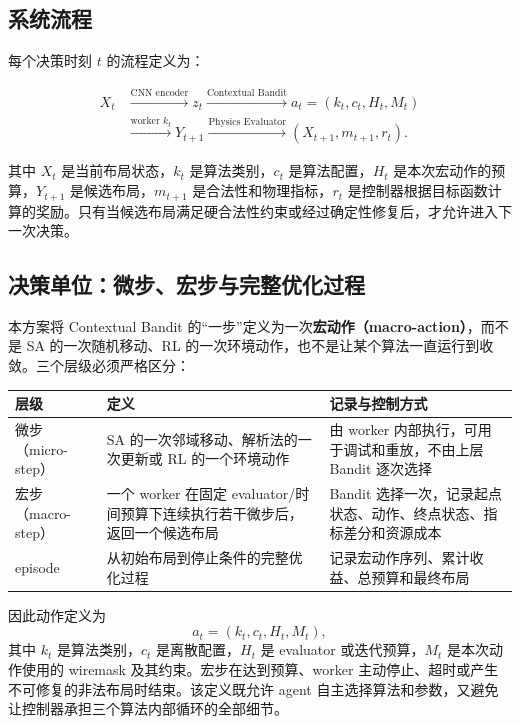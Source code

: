 \documentclass[UTF8,a4paper,11pt]{ctexart}
\newcommand{\important}[1]{\textbf{#1}}
\begin{document}
\subsection{系统流程}

每个决策时刻 \(t\) 的流程定义为：

\begin{equation}
\begin{aligned}
X_t &\xrightarrow{\text{CNN encoder}} z_t
\xrightarrow{\text{Contextual Bandit}} a_t=(k_t,c_t,H_t,M_t)
\\[-0.2em]
&\xrightarrow{\text{worker }k_t}
Y_{t+1}
\xrightarrow{\text{Physics Evaluator}}
(X_{t+1},m_{t+1},r_t).
\end{aligned}
\end{equation}

其中 \(X_t\) 是当前布局状态，\(k_t\) 是算法类别，\(c_t\) 是算法配置，\(H_t\) 是本次宏动作的预算，\(Y_{t+1}\) 是候选布局，\(m_{t+1}\) 是合法性和物理指标，\(r_t\) 是控制器根据目标函数计算的奖励。只有当候选布局满足硬合法性约束或经过确定性修复后，才允许进入下一次决策。

\subsection{决策单位：微步、宏步与完整优化过程}

本方案将 Contextual Bandit 的“一步”定义为一次\important{宏动作（macro-action）}，而不是 SA 的一次随机移动、RL 的一次环境动作，也不是让某个算法一直运行到收敛。三个层级必须严格区分：

\begin{table}[htbp]
\centering
\small
\begin{tabularx}{\textwidth}{p{}p{}X}
\toprule
层级 & 定义 & 记录与控制方式 \\
\midrule
微步（micro-step） & SA 的一次邻域移动、解析法的一次更新或 RL 的一个环境动作 & 由 worker 内部执行，可用于调试和重放，不由上层 Bandit 逐次选择 \\
宏步（macro-step） & 一个 worker 在固定 evaluator/时间预算下连续执行若干微步后，返回一个候选布局 & Bandit 选择一次，记录起点状态、动作、终点状态、指标差分和资源成本 \\
episode & 从初始布局到停止条件的完整优化过程 & 记录宏动作序列、累计收益、总预算和最终布局 \\
\bottomrule
\end{tabularx}
\end{table}

因此动作定义为
\begin{equation}
a_t=(k_t,c_t,H_t,M_t),
\end{equation}
其中 \(k_t\) 是算法类别，\(c_t\) 是离散配置，\(H_t\) 是 evaluator 或迭代预算，\(M_t\) 是本次动作使用的 wiremask 及其约束。宏步在达到预算、worker 主动停止、超时或产生不可修复的非法布局时结束。该定义既允许 agent 自主选择算法和参数，又避免让控制器承担三个算法内部循环的全部细节。
\end{document}
